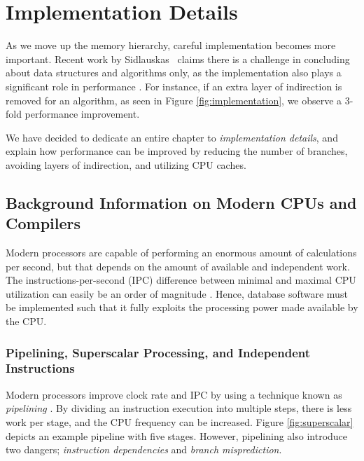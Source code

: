 \chapter{Implementation Details}
\label{chap:Implementation Details}

As we move up the memory hierarchy, careful implementation becomes more important. Recent work by Sidlauskas \ea~claims there is a challenge in concluding about data structures and algorithms only, as the implementation also plays a significant role in performance \cite{Sidlauskas2014-ef}. For instance, if an extra layer of indirection is removed for an algorithm, as seen in Figure \ref{fig:implementation}, we observe a 3-fold performance improvement. 

We have decided to dedicate an entire chapter to \textit{implementation details}, and explain how performance can be improved by reducing the number of branches, avoiding layers of indirection, and utilizing CPU caches.

\newpage

\section{Background Information on Modern CPUs and Compilers}
\label{sec:Background Information on Modern CPUs and Compilers}
Modern processors are capable of performing an enormous amount of calculations per second, but that depends on the amount of available and independent work. The instructions-per-second (IPC) difference between minimal and maximal CPU utilization can easily be an order of magnitude \cite{Boncz2005-wj}. Hence, database software must be implemented such that it fully exploits the processing power made available by the CPU.

\subsection{Pipelining, Superscalar Processing, and Independent Instructions}
\label{sub:Pipelining, Superscalar Processing, and Independent Instructions}
Modern processors improve clock rate and IPC by using a technique known as \textit{pipelining} \cite{Boncz2005-wj}. By dividing an instruction execution into multiple steps, there is less work per stage, and the CPU frequency can be increased. Figure \ref{fig:superscalar} depicts an example pipeline with five stages. However, pipelining also introduce two dangers; \textit{instruction dependencies} and \textit{branch misprediction}.


